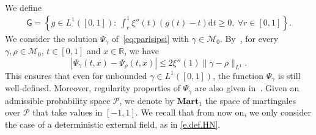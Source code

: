 \documentclass[11pt]{amsart}
\newtheorem{lemma}[proposition]{Lemma}
\theoremstyle{remark}
\theoremstyle{definition}
\numberwithin{equation}{section}
\numberwithin{proposition}{section}
\numberwithin{figure}{section}
\numberwithin{table}{section}
\newcommand{\R}{\mathbb{R}}
\renewcommand{\le}{\leqslant}
\renewcommand{\geq}{\geqslant}
\newcommand{\Ll}{\left}
\newcommand{\Rr}{\right}
\renewcommand{\d}{\mathrm{d}}
\newcommand{\1}{\mathbf{1}}
\newcommand{\mcl}{\mathcal}
\newcommand{\msf}{\mathsf}
\newcommand{\msc}{\mathscr}
\newcommand{\ga}{\gamma}
\newcommand{\bmart}{\mathbf{Mart}}
\begin{document}
We define
\begin{align}\label{e.G=}
    \msf G = \Ll\{g\in L^1([0,1]):\: \int_r^1 \xi''(t)\Ll(g(t) -t \Rr)\d t\geq 0, \ \forall r\in [0,1]\Rr\}.
\end{align}
We consider the solution $\Psi_\gamma$ of~\eqref{eq:parisipsi} with $\gamma \in \mcl M_0$.
By~\cite[Proposition~2~(i)]{chen2018energy}, for every $\gamma, \rho \in \mcl M_0$, $t \in [0,1]$ and $x \in \R$, we have
\begin{equation*}  %
\Ll| \Psi_\ga(t,x) -  \Psi_{\rho}(t,x) \Rr| \le 2\xi''(1)  \|\ga  - \rho\|_{L^1}.
\end{equation*}
This ensures that even for unbounded $\gamma \in L^1([0,1])$, the function $\Psi_\gamma$ is still well-defined. Moreover, regularity properties of $\Psi_\gamma$ are also given in~\cite[Proposition~2]{chen2018energy}. 
Given an admissible probability space $\msc P$, we denote by $\bmart_1$ the space of martingales over $\msc P$ that take values in $[-1,1]$. We recall that from now on, we only consider the case of a deterministic external field, as in \eqref{e.def.HN}.
\end{document}

